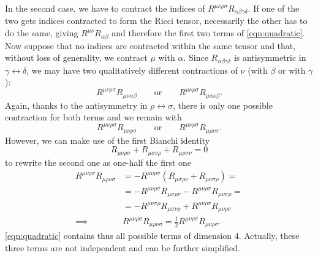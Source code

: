 \documentclass[a4paper,12pt]{book}
\begin{document}
In the second case, we have to contract the indices of $R^{\mu\nu\rho\sigma}R_{\alpha\beta\gamma\delta}$. If one of the two gets indices contracted to form the Ricci tensor, necessarily the other has to do the same, giving $R^{\mu\nu}R_{\alpha\beta}$ and therefore the first two terms of \cref{eqn:quadratic}. Now suppose that no indices are contracted within the same tensor and that, without loss of generality, we contract $\mu$ with $\alpha$. Since $R_{\alpha\beta\gamma\delta}$ is antisymmetric in $\gamma\leftrightarrow\delta$, we may have two qualitatively different contractions of $\nu$ (with $\beta$ or with $\gamma$):
\[R^{\mu\nu\rho\sigma}R_{\mu\nu\alpha\beta}\qquad\text{or}\qquad R^{\mu\nu\rho\sigma}R_{\mu\alpha\nu\beta}.\]
Again, thanks to the antisymmetry in $\rho\leftrightarrow\sigma$, there is only one possible contraction for both terms and we remain with
\[R^{\mu\nu\rho\sigma}R_{\mu\nu\rho\sigma}\qquad\text{or}\qquad R^{\mu\nu\rho\sigma}R_{\mu\rho\nu\sigma}.\]
However, we can make use of the first Bianchi identity
\[R_{\mu\nu\rho\sigma}+R_{\mu\sigma\nu\rho}+R_{\mu\rho\sigma\nu}=0\]
to rewrite the second one as one-half the first one
\begin{align*}
R^{\mu\nu\rho\sigma}R_{\mu\rho\nu\sigma}&=-R^{\mu\nu\rho\sigma}(R_{\mu\sigma\rho\nu}+R_{\mu\nu\sigma\rho})=\\
&=-R^{\mu\nu\rho\sigma}R_{\mu\sigma\rho\nu}-R^{\mu\nu\rho\sigma}R_{\mu\nu\sigma\rho}=\\
&=-R^{\mu\nu\sigma\rho}R_{\mu\sigma\nu\rho}+R^{\mu\nu\rho\sigma}R_{\mu\nu\rho\sigma}\\
\implies &R^{\mu\nu\rho\sigma}R_{\mu\rho\nu\sigma}=\frac12R^{\mu\nu\rho\sigma}R_{\mu\nu\rho\sigma}.
\end{align*}
\cref{eqn:quadratic} contains thus all possible terms of dimension 4. Actually, these three terms are not independent and can be further simplified.
\end{document}
